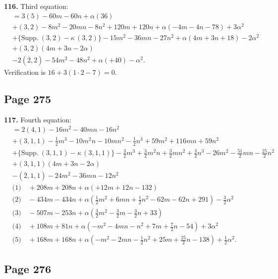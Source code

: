 \documentclass[11pt,a4paper]{article}
\theoremstyle{definition}
\begin{document}
\medskip
\noindent\textbf{116.} Third equation:
\begin{align*}
&= 3(5) - 60m - 60n + \alpha(36)\\
&+ (3,2) - 8m^2 - 20mn - 8n^2 + 120m + 120n + \alpha(-4m - 4n - 78) + 3\alpha^2\\
&+ \{\text{Supp.}\ (3,2) - \kappa\,(3,2)\} - 15m^2 - 36mn - 27n^2 + \alpha(4m + 3n + 18) - 2\alpha^2\\
&+ (3,2)(4m + 3n - 2\alpha)\\
&- 2(\overline{2},2) - 54m^2 - 48n^2 + \alpha(+40) - \alpha^2.
\end{align*}
Verification is $16 + 3(1 \cdot 2 - 7) = 0$.

\subsection*{Page 275}

\noindent\textbf{117.} Fourth equation:
\begin{align*}
&= 2(4,1) - 16m^2 - 40mn - 16n^2 \tag{1}\\
&+ (3,1,1) - \tfrac{1}{2}m^3 - 10m^2n - 10mn^2 - \tfrac{1}{2}n^3 + 59m^2 + 116mn + 59n^2 \tag{2}\\
&+ \{\text{Supp.}\ (3,1,1) - \kappa\,(3,1,1)\} - \tfrac{3}{2}m^3 + \tfrac{3}{2}m^2n + \tfrac{3}{2}mn^2 + \tfrac{3}{2}n^3 - 26m^2 - \tfrac{51}{2}mn - \tfrac{25}{2}n^2 \tag{3}\\
&+ (3,1,1)(4m + 3n - 2\alpha) \tag{4}\\
&- (\overline{2},1,1) - 24m^2 - 36mn - 12n^2 \tag{5}\\
&\text{(1)}\quad + 208m + 208n + \alpha(+12m + 12n - 132)\\
&\text{(2)}\quad - 434m - 434n + \alpha(\tfrac{1}{2}m^2 + 6mn + \tfrac{1}{2}n^2 - 62m - 62n + 291) - \tfrac{3}{2}\alpha^2\\
&\text{(3)}\quad - 507m - 253n + \alpha(\tfrac{3}{2}m^2 - \tfrac{3}{2}m - \tfrac{3}{2}n + 33)\\
&\text{(4)}\quad + 108m + 81n + \alpha(-m^2 - 4mn - n^2 + 7m + \tfrac{7}{2}n - 54) + 3\alpha^2\\
&\text{(5)}\quad + 168m + 168n + \alpha(-m^2 - 2mn - \tfrac{1}{2}n^2 + 25m + \tfrac{25}{2}n - 138) + \tfrac{1}{2}\alpha^2.
\end{align*}

\subsection*{Page 276}
\end{document}
